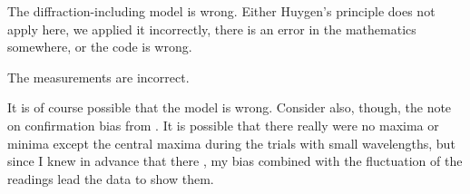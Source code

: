 \documentclass{paper}
\begin{document}
\begin{boldenumerate}
    \item The diffraction-including model is wrong. Either Huygen's principle does not apply here, we applied it incorrectly, there is an error in the mathematics somewhere, or the code is wrong.
    
    \item The measurements are incorrect.
\end{boldenumerate}

It is of course possible that the model is wrong. Consider also, though, the note on confirmation bias from . It is possible that there really were no maxima or minima except the central maxima during the trials with small wavelengths, but since I knew in advance that there , my bias combined with the fluctuation of the readings lead the data to show them.

\pagebreak

\printbibliography[heading=bibintoc]

\pagebreak
\end{document}
